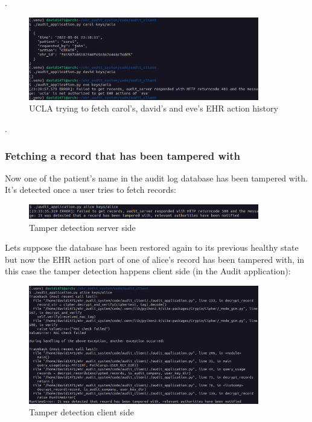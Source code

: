 \documentclass[11pt]{article}
\begin{document}
\begin{flushleft}
\newpage

.

\newpage

\begin{figure}[h!]
\begin{center}
	\includegraphics[width = 380px]{images/ucla_fetch_requests.png}
	\caption{UCLA trying to fetch carol's, david's and eve's EHR action history}
\end{center}
\end{figure}

.


\newpage

\newpage

\subsubsection{Fetching a record that has been tampered with}

Now one of the patient's name in the audit log database has been tampered with. It's detected once a user tries to fetch records:

\begin{figure}[h!]
	\begin{center}
		\includegraphics[width = 380px]{images/tamper_detection_server_side.png}
		\caption{Tamper detection server side}
	\end{center}
\end{figure}

Lets suppose the database has been restored again to its previous healthy state but now the EHR action part of one of alice's record has been tampered with, in this case the tamper detection happens client side (in the Audit application):

\newpage

\begin{figure}[h!]
	\begin{center}
		\includegraphics[width = 380px]{images/tamper_detection_client_side.png}
		\caption{Tamper detection client side}
	\end{center}
\end{figure}


\end{flushleft}
\end{document}
